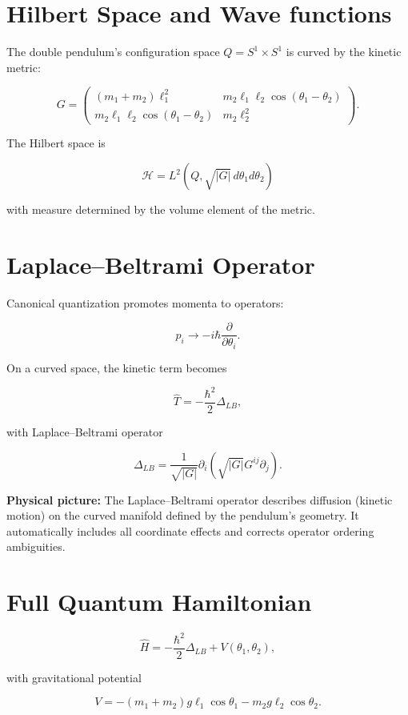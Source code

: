 \documentclass[11pt]{book}
\begin{document}
\section{Hilbert Space and Wave functions}

The double pendulum’s configuration space $Q = S^1 \times S^1$ is curved by the kinetic metric:

\[
G =
\begin{pmatrix}
(m_1+m_2)\ell_1^2 & m_2 \ell_1 \ell_2 \cos(\theta_1-\theta_2) \\
m_2 \ell_1 \ell_2 \cos(\theta_1-\theta_2) & m_2 \ell_2^2
\end{pmatrix}.
\]

The Hilbert space is

\[
\mathcal{H} = L^2(Q, \sqrt{|G|}\, d\theta_1 d\theta_2)
\]

with measure determined by the volume element of the metric.

\section{Laplace--Beltrami Operator}

Canonical quantization promotes momenta to operators:

\[
p_i \to -i\hbar \frac{\partial}{\partial \theta_i}.
\]

On a curved space, the kinetic term becomes

\[
\hat T = -\frac{\hbar^2}{2} \Delta_{LB},
\]

with Laplace--Beltrami operator

\[
\Delta_{LB} = \frac{1}{\sqrt{|G|}} \partial_i \left( \sqrt{|G|} G^{ij} \partial_j \right).
\]

\textbf{Physical picture:} The Laplace--Beltrami operator describes diffusion (kinetic motion) on the curved manifold defined by the pendulum’s geometry. It automatically includes all coordinate effects and corrects operator ordering ambiguities.

\section{Full Quantum Hamiltonian}

\[
\hat H = -\frac{\hbar^2}{2} \Delta_{LB} + V(\theta_1,\theta_2),
\]

with gravitational potential

\[
V = -(m_1+m_2) g \ell_1 \cos\theta_1 - m_2 g \ell_2 \cos\theta_2.
\]
\end{document}
